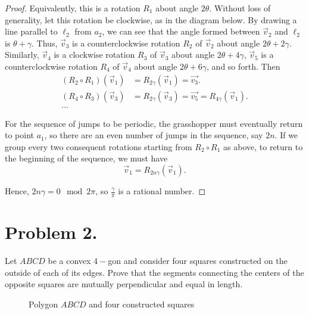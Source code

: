 \documentclass{article}
\begin{document}
\begin{proof}
\par Equivalently, this is a rotation $R_1$ about angle $2\theta$. Without loss of generality, let this rotation be clockwise, as in the diagram below. By drawing a line parallel to $\ell_2$ from $a_2$, we can see that the angle formed between $\overrightarrow{v}_2$ and $\ell_2$ is $\theta+\gamma$. Thus, $\overrightarrow{v}_3$ is a counterclockwise rotation $R_2$ of $\overrightarrow{v}_2$ about angle $2\theta+2\gamma$. Similarly, $\overrightarrow{v}_4$ is a clockwise rotation $R_3$ of $\overrightarrow{v}_3$ about angle $2\theta+4\gamma$, $\overrightarrow{v}_5$ is a counterclockwise rotation $R_4$ of $\overrightarrow{v}_4$ about angle $2\theta+6\gamma$, and so forth. Then
\begin{align*}
    (R_2\circ R_1)(\overrightarrow{v}_1) &= R_{2\gamma}(\overrightarrow{v}_1)=\overrightarrow{v_3}.\\
    (R_4\circ R_3)(\overrightarrow{v}_3) &= R_{2\gamma}(\overrightarrow{v}_3)=\overrightarrow{v_5}=R_{4\gamma}(\overrightarrow{v}_1).\\
    \dots
\end{align*}
\par For the sequence of jumps to be periodic, the grasshopper must eventually return to point $a_1$, so there are an even number of jumps in the sequence, say $2n$. If we group every two consequent rotations starting from $R_2\circ R_1$ as above, to return to the beginning of the sequence, we must have 
\[\overrightarrow{v}_1=R_{2n\gamma}(\overrightarrow{v}_1).\]
\par Hence, $2n\gamma=0\mod{2\pi}$, so $\frac{\gamma}{\pi}$ is a rational number.
\end{proof}


\section{Problem 2.}
Let $ABCD$ be a convex $4-$gon and consider four squares constructed on the outside of each of its edges. Prove that the segments connecting the centers of the opposite squares are mutually perpendicular and equal in length.

\begin{figure}[h]
    \centering
    
    \caption{Polygon $ABCD$ and four constructed squares}
\end{figure}
\end{document}
